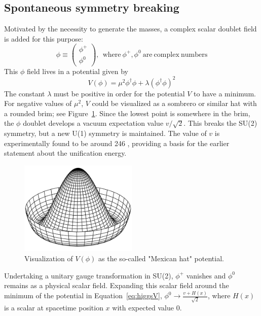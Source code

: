 \subsection{Spontaneous symmetry breaking}
\label{higgs}

Motivated by the necessity to generate the masses, a complex scalar doublet field is added for this purpose:
\begin{equation}
\phi \equiv \begin{pmatrix} \phi^+ \\ \phi^0 \end{pmatrix}, \:\:\mathrm{where~} \phi^+, \phi^0 \:\mathrm{are~complex~numbers}
\end{equation}
This $\phi$ field lives in a potential given by 
\begin{equation}
V(\phi) = \mu^2 \phi^\dagger \phi + \lambda (\phi^\dagger \phi)^2 \label{eq:higgsV}
\end{equation}
The constant $\lambda$ must be positive in order for the potential $V$ to have a minimum.
For negative values of $\mu^2$, $V$ could be visualized as a sombrero or similar hat with a rounded brim; see Figure~\ref{fig:mexican_hat}.
Since the lowest point is somewhere in the brim, 
the $\phi$ doublet develops a vacuum expectation value $v/\sqrt{2}$.
This breaks the SU(2) symmetry, but a new U(1) symmetry is maintained.
The value of $v$ is experimentally found to be around 246 \GeV,
providing a basis for the earlier statement about the unification energy.

\begin{figure}
\centering
\includegraphics[width=0.5\textwidth]{figures/mexican_hat.png}
\caption{Visualization of $V(\phi)$ as the so-called "Mexican hat" potential.}
\label{fig:mexican_hat}
\end{figure}


Undertaking a unitary gauge transformation in SU(2), $\phi^+$ vanishes and $\phi^0$ remains as a physical scalar field.
Expanding this scalar field around the minimum of the potential in Equation~\ref{eq:higgsV}, $\phi^0 \rightarrow \frac{v+H(x)}{\sqrt{2}}$,
where $H(x)$ is a scalar at spacetime position $x$ with expected value 0.

